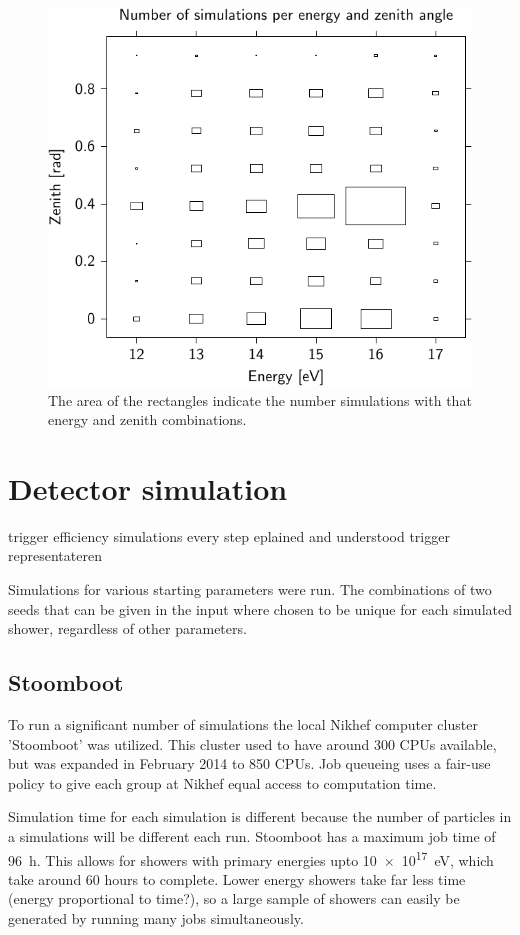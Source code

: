 
\begin{figure}
    \centering
    \includegraphics[width=0.7\linewidth]
        {plots/simulations/proton_energy_zenith}
    \caption{ The area of the
             rectangles indicate the number simulations with that energy
             and zenith combinations.}
    \label{fig:simulations_proton_energy_zenith}
\end{figure}


\section{Detector simulation}

trigger efficiency
simulations
every step eplained and understood
trigger representateren

Simulations for various starting parameters were run. The combinations
of two seeds that can be given in the input where chosen to be unique
for each simulated shower, regardless of other parameters.


\subsection{Stoomboot}

To run a significant number of simulations the local Nikhef
computer cluster 'Stoomboot' was utilized. This cluster used to have
around 300 CPUs available, but was expanded in February 2014 to 850
CPUs. Job queueing uses a fair-use policy to give each group at Nikhef
equal access to computation time.

Simulation time for each simulation is different because the number of
particles in a simulations will be different each run. Stoomboot has a
maximum job time of \SI{96}{\hour}. This allows for showers with primary
energies upto \SI{10e17}{\electronvolt}, which take around 60 hours to
complete. Lower energy showers take far less time (energy proportional
to time?), so a large sample of showers can easily be generated by
running many jobs simultaneously.

